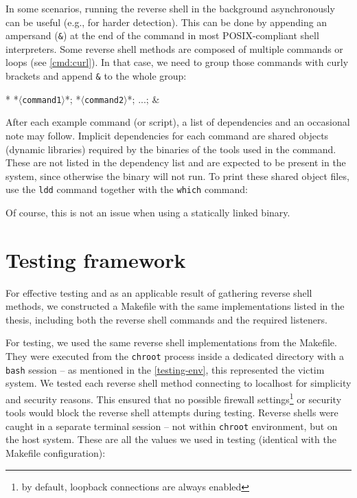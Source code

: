 In some scenarios, running the reverse shell in the background asynchronously can be useful (e.g., for harder detection). This can be done by appending an ampersand (\texttt{\&}) at the end of the command \cite{bash-gnu-man} in most POSIX-compliant shell interpreters. Some reverse shell methods are composed of multiple commands or loops (see \cref{cmd:curl}). In that case, we need to group those commands with curly brackets and append \texttt{\&} to the whole group:

\begin{cmdline}{*}{}{}
{ *\textcolor{placeholder}{\texttt{$\langle$command1$\rangle$}}*; *\textcolor{placeholder}{\texttt{$\langle$command2$\rangle$}}*; ...; } &
\end{cmdline}

After each example command (or script), a list of dependencies and an occasional note may follow. Implicit dependencies for each command are shared objects (dynamic libraries) required by the binaries of the tools used in the command. These are not listed in the dependency list and are expected to be present in the system, since otherwise the binary will not run. To print these shared object files, use the \texttt{ldd} command \cite{ldd-man} together with the \texttt{which} \cite{which-man} command:

Of course, this is not an issue when using a statically linked binary.


\section{Testing framework}

For effective testing and as an applicable result of gathering reverse shell methods, we constructed a Makefile with the same implementations listed in the thesis, including both the reverse shell commands and the required listeners.

For testing, we used the same reverse shell implementations from the Makefile. They were executed from the \texttt{chroot} process inside a dedicated directory with a \texttt{bash} session -- as mentioned in the \cref{testing-env}, this represented the victim system. We tested each reverse shell method connecting to localhost for simplicity and security reasons. This ensured that no possible firewall settings\footnote{by default, loopback connections are always enabled} or security tools would block the reverse shell attempts during testing. Reverse shells were caught in a separate terminal session -- not within \texttt{chroot} environment, but on the host system. These are all the values we used in testing (identical with the Makefile configuration):

